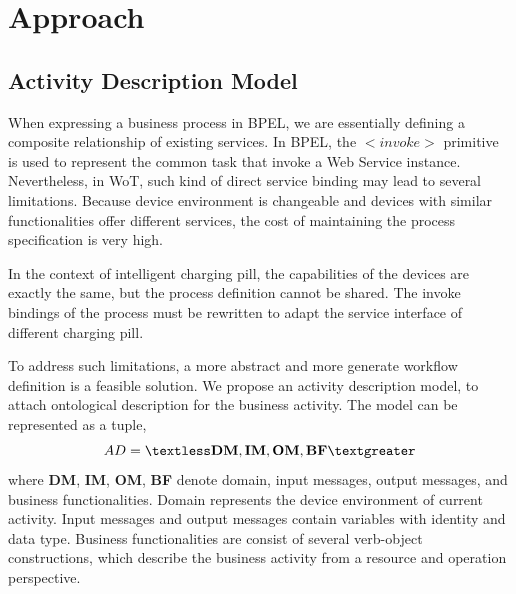\section{Approach}
\label{Approach}
\subsection{Activity Description Model}
When expressing a business process in BPEL, we are essentially defining a composite relationship of existing services. In BPEL, the $<invoke>$ primitive is used to represent the common task that invoke a Web Service instance. Nevertheless, in WoT, such kind of direct service binding may lead to several limitations. Because device environment is changeable and devices with similar functionalities offer different services, the cost of maintaining the process specification is very high. 

In the context of intelligent charging pill, the capabilities of the devices are exactly the same, but the process definition cannot be shared. The invoke bindings of the process must be rewritten to adapt the service interface of different charging pill. 

To address such limitations, a more abstract and more generate workflow definition is a feasible solution. We propose an activity description model, to attach ontological description for the business activity. The model can be represented as a tuple, 
\begin{equation}
	{AD} = \textless\textbf{DM}, \textbf{IM}, \textbf{OM}, \textbf{BF}\textgreater
\end{equation}where \textbf{DM}, \textbf{IM}, \textbf{OM}, \textbf{BF} denote domain, input messages, output messages, and business functionalities. Domain represents the device environment of current activity. Input messages and output messages contain variables with identity and data type. Business functionalities are consist of several verb-object constructions, which describe the business activity from a resource and operation perspective. 

